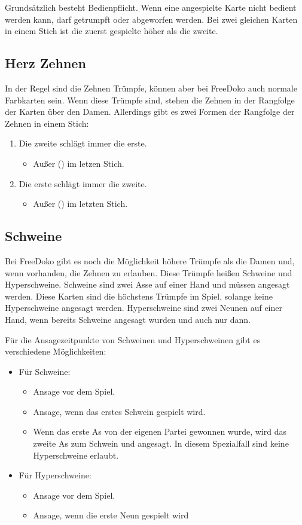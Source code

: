 \documentclass{scrartcl}
\begin{document}
Grundsätzlich besteht Bedienpflicht. Wenn eine angespielte Karte nicht bedient werden kann, darf getrumpft oder abgeworfen werden.  Bei zwei gleichen Karten in einem Stich ist die zuerst gespielte höher als die zweite.

\subsection{Herz Zehnen}
In der Regel sind die \herz Zehnen Trümpfe, können aber \optional bei FreeDoko auch normale Farbkarten sein. Wenn diese Trümpfe sind, stehen die \herz Zehnen in der Rangfolge der Karten über den \kreuz Damen. Allerdings gibt es \optional zwei Formen der Rangfolge der \herz Zehnen in einem Stich:
\begin{enumerate}
  \item Die zweite schlägt immer die erste.
    \begin{itemize}
      \item Außer (\optional) im letzen Stich.
    \end{itemize}
  \item Die erste schlägt immer die zweite.
    \begin{itemize}
      \item Außer (\optional) im letzten Stich.
    \end{itemize}
\end{enumerate}

\subsection{Schweine}
Bei FreeDoko gibt es \optional noch die Möglichkeit höhere Trümpfe als die \kreuz Damen und, wenn vorhanden, die \herz Zehnen zu erlauben. Diese Trümpfe heißen Schweine und Hyperschweine. Schweine sind zwei \karo Asse auf einer Hand und müssen angesagt werden. Diese Karten sind die höchstens Trümpfe im Spiel, solange keine Hyperschweine angesagt werden. Hyperschweine sind zwei \karo Neunen auf einer Hand, wenn bereits Schweine angesagt wurden und auch nur dann.

Für die Ansagezeitpunkte von Schweinen und Hyperschweinen gibt es \optional verschiedene Möglichkeiten:
\begin{itemize}
  \item Für Schweine:
    \begin{itemize}
      \item Ansage vor dem Spiel.
      \item Ansage, wenn das erstes Schwein gespielt wird.
      \item Wenn das erste As von der eigenen Partei gewonnen wurde, wird das
	zweite \karo As zum Schwein und angesagt.
	In diesem Spezialfall sind keine Hyperschweine erlaubt.
    \end{itemize}
  \item Für Hyperschweine:
    \begin{itemize}
      \item Ansage vor dem Spiel.
      \item Ansage, wenn die erste Neun gespielt wird
    \end{itemize}
\end{itemize}
\end{document}
